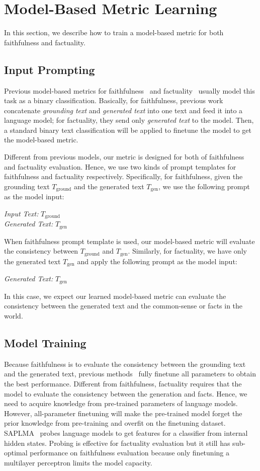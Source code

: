 \section{Model-Based Metric Learning}
In this section, we describe how to train a model-based metric for both faithfulness and factuality.

\subsection{Input Prompting}
Previous model-based metrics for faithfulness~\cite{Gekhman2023TrueTeacherLF} and factuality~\cite{Azaria2023TheIS} usually model this task as a binary classification. Basically, for faithfulness, previous work~\cite{Gekhman2023TrueTeacherLF} concatenate \textit{grounding text} and \textit{generated text} into one text and feed it into a language model; for factuality, they send only \textit{generated text} to the model. Then, a standard binary text classification will be applied to finetune the model to get the model-based metric.

Different from previous models, our metric is designed for both of faithfulness and factuality evaluation. Hence, we use two kinds of prompt templates for faithfulness and factuality respectively. Specifically, for faithfulness, given the grounding text $T_{\mathrm{ground}}$ and the generated text $T_{\mathrm{gen}}$, we use the following prompt as the model input:

\textit{Input Text: }$T_{\mathrm{ground}}$ \\
\textit{Generated Text: } $T_{\mathrm{gen}}$

When faithfulness prompt template is used, our model-based metric will evaluate the consistency between $T_{\mathrm{ground}}$ and $T_{\mathrm{gen}}$. Similarly, for factuality, we have only the generated text $T_{\mathrm{gen}}$ and apply the following prompt as the model input:

\textit{Generated Text: } $T_{\mathrm{gen}}$

In this case, we expect our learned model-based metric can evaluate the consistency between the generated text and the common-sense or facts in the world.

\subsection{Model Training}
Because faithfulness is to evaluate the consistency between the grounding text and the generated text, previous methods~\cite{Gekhman2023TrueTeacherLF} fully finetune all parameters to obtain the best performance. Different from faithfulness, factuality requires that the model to evaluate the consistency between the generation and facts. Hence, we need to acquire knowledge from pre-trained parameters of language models. However, all-parameter finetuning will make the pre-trained model forget the prior knowledge from pre-training and overfit on the finetuning dataset. SAPLMA~\cite{Azaria2023TheIS} probes language models to get features for a classifier from internal hidden states. Probing is effective for factuality evaluation but it still has sub-optimal performance on faithfulness evaluation because only finetuning a multilayer perceptron limits the model capacity.

